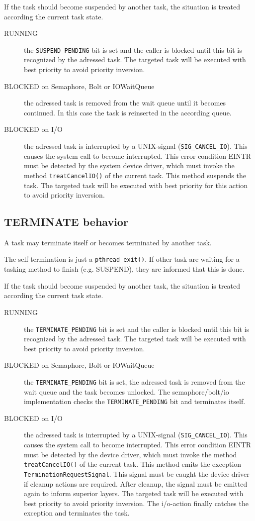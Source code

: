 If the task should become suspended by another task, 
the situation is treated according the current task state.
\begin{description}
\item[RUNNING] the \verb|SUSPEND_PENDING| bit is set and the caller
   is blocked until this bit is recognized by the adressed task.
   The targeted task will be executed with best priority to avoid
   priority inversion.
\item[BLOCKED on Semaphore, Bolt or IOWaitQueue]
   the adressed task is removed from the
   wait queue until it becomes continued. In this case the task is reinserted
   in the according queue.
\item[BLOCKED on I/O] the adressed task is interrupted by a 
   UNIX-signal (\verb|SIG_CANCEL_IO|). This causes the system
   call to become interrupted. This error condition EINTR must 
   be detected by the system device driver, which must invoke the method
   \verb|treatCancelIO()| of the current task. This method suspends 
   the task.
   The targeted task will be executed with best priority for this 
   action to avoid
   priority inversion.
\end{description}

\subsection{TERMINATE behavior}
A task may terminate itself or becomes terminated by another task.

The self termination is just a \verb|pthread_exit()|.
If other task are waiting for a tasking method to finish (e.g. SUSPEND),
they are informed that this is done.

If the task should become suspended by another task, 
the situation is treated according the current task state.
\begin{description}
\item[RUNNING] the \verb|TERMINATE_PENDING| bit is set and the caller
   is blocked until this bit is recognized by the adressed task.
   The targeted task will be executed with best priority to avoid
   priority inversion.
\item[BLOCKED on Semaphore, Bolt or IOWaitQueue]
   the \verb|TERMINATE_PENDING| bit is set,
   the adressed task is removed from the
   wait queue and the task becomes unlocked. 
   The semaphore/bolt/io implementation checks the \verb|TERMINATE_PENDING|
   bit and terminates itself.
\item[BLOCKED on I/O] the adressed task is interrupted by a 
   UNIX-signal (\verb|SIG_CANCEL_IO|). This causes the system
   call to become interrupted. This error condition EINTR must 
   be detected by the device driver, which must invoke the method
   \verb|treatCancelIO()| of the current task. This method emits the 
   exception \verb|TerminationRequestSignal|. This signal must be caught
   the device driver if cleanup actions are required. After cleanup,
   the signal must be emitted again to inform superior layers.
   The targeted task will be executed with best priority to avoid
   priority inversion. 
   The i/o-action finally catches the exception and terminates the task.
\end{description}



